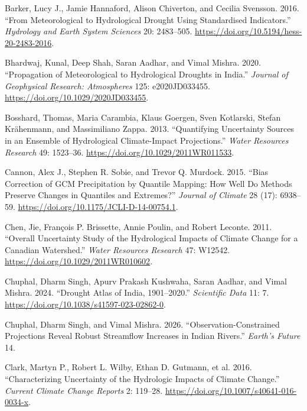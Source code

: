 \documentclass[
  11pt,
]{article}
\newlength{\cslhangindent}
\newenvironment{CSLReferences}[2] %
 {\begin{list}{}{%
  \setlength{\itemindent}{0pt}
  \setlength{\leftmargin}{0pt}
  \setlength{\parsep}{0pt}
  \ifodd #1
   \setlength{\leftmargin}{\cslhangindent}
   \setlength{\itemindent}{-1\cslhangindent}
  \fi
  \setlength{\itemsep}{#2\baselineskip}}}
 {\end{list}}
\begin{document}
\protect{}\label{refs}
\begin{CSLReferences}{1}{1}
Barker, Lucy J., Jamie Hannaford, Alison Chiverton, and Cecilia
Svensson. 2016. {``From Meteorological to Hydrological Drought Using
Standardised Indicators.''} \emph{Hydrology and Earth System Sciences}
20: 2483--505. \url{https://doi.org/10.5194/hess-20-2483-2016}.

Bhardwaj, Kunal, Deep Shah, Saran Aadhar, and Vimal Mishra. 2020.
{``Propagation of Meteorological to Hydrological Droughts in {India}.''}
\emph{Journal of Geophysical Research: Atmospheres} 125: e2020JD033455.
\url{https://doi.org/10.1029/2020JD033455}.

Bosshard, Thomas, Maria Carambia, Klaus Goergen, Sven Kotlarski, Stefan
Krähenmann, and Massimiliano Zappa. 2013. {``Quantifying Uncertainty
Sources in an Ensemble of Hydrological Climate-Impact Projections.''}
\emph{Water Resources Research} 49: 1523--36.
\url{https://doi.org/10.1029/2011WR011533}.

Cannon, Alex J., Stephen R. Sobie, and Trevor Q. Murdock. 2015. {``Bias
Correction of {GCM} Precipitation by Quantile Mapping: How Well Do
Methods Preserve Changes in Quantiles and Extremes?''} \emph{Journal of
Climate} 28 (17): 6938--59.
\url{https://doi.org/10.1175/JCLI-D-14-00754.1}.

Chen, Jie, François P. Brissette, Annie Poulin, and Robert Leconte.
2011. {``Overall Uncertainty Study of the Hydrological Impacts of
Climate Change for a {Canadian} Watershed.''} \emph{Water Resources
Research} 47: W12542. \url{https://doi.org/10.1029/2011WR010602}.

Chuphal, Dharm Singh, Apurv Prakash Kushwaha, Saran Aadhar, and Vimal
Mishra. 2024. {``Drought Atlas of {India}, 1901--2020.''}
\emph{Scientific Data} 11: 7.
\url{https://doi.org/10.1038/s41597-023-02862-0}.

Chuphal, Dharm Singh, and Vimal Mishra. 2026. {``Observation-Constrained
Projections Reveal Robust Streamflow Increases in {Indian} Rivers.''}
\emph{Earth's Future} 14.

{Clark, Martyn P., Robert L. Wilby, Ethan D. Gutmann, et al.} 2016.
{``Characterizing Uncertainty of the Hydrologic Impacts of Climate
Change.''} \emph{Current Climate Change Reports} 2: 119--28.
\url{https://doi.org/10.1007/s40641-016-0034-x}.


\end{CSLReferences}
\end{document}

